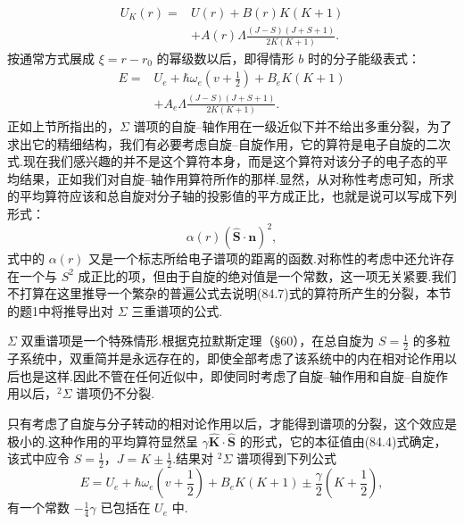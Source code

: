 \begin{equation}
\begin{aligned}
  U_K(r)={}&U(r)+B(r)K(K+1)\\
  &+A(r)\Lambda\frac{(J-S)(J+S+1)}{2K(K+1)}.
\end{aligned}
\end{equation}
按通常方式展成 $\xi=r-r_0$ 的幂级数以后，即得情形 $b$ 时的分子能级表式：
\begin{equation}
\begin{aligned}
  E={}&U_e+\hbar\omega_e\left(v+\frac{1}{2}\right)+B_eK(K+1)\\
  &+A_e\Lambda\frac{(J-S)(J+S+1)}{2K(K+1)}.
\end{aligned}
\end{equation}
正如上节所指出的，$\Sigma$ 谱项的自旋–轴作用在一级近似下并不给出多重分裂，为了求出它的精细结构，我们有必要考虑自旋–自旋作用，它的算符是电子自旋的二次式.现在我们感兴趣的并不是这个算符本身，而是这个算符对该分子的电子态的平均结果，正如我们对自旋–轴作用算符所作的那样.显然，从对称性考虑可知，所求的平均算符应该和总自旋对分子轴的投影值的平方成正比，也就是说可以写成下列形式：
\begin{equation}
  \alpha(r)(\hat{\boldsymbol{S}}\cdot\boldsymbol{n})^2,
\end{equation}
式中的 $\alpha(r)$ 又是一个标志所给电子谱项的距离的函数.对称性的考虑中还允许存在一个与 $S^2$ 成正比的项，但由于自旋的绝对值是一个常数，这一项无关紧要.我们不打算在这里推导一个繁杂的普遍公式去说明(84.7)式的算符所产生的分裂，本节的题1中将推导出对 $\Sigma$ 三重谱项的公式.

$\Sigma$ 双重谱项是一个特殊情形.根据克拉默斯定理（§60），在总自旋为 $S=\frac{1}{2}$ 的多粒子系统中，双重简并是永远存在的，即使全部考虑了该系统中的内在相对论作用以后也是这样.因此不管在任何近似中，即使同时考虑了自旋–轴作用和自旋–自旋作用以后，$^2\Sigma$ 谱项仍不分裂.

只有考虑了自旋与分子转动的相对论作用以后，才能得到谱项的分裂，这个效应是极小的.这种作用的平均算符显然呈 $\gamma\hat{\boldsymbol{K}}\cdot\hat{\boldsymbol{S}}$ 的形式，它的本征值由(84.4)式确定，该式中应令 $S=\frac{1}{2}$，$J=K\pm\frac{1}{2}$.结果对 $^2\Sigma$ 谱项得到下列公式
\begin{equation}
  E=U_e+\hbar\omega_e\left(v+\frac{1}{2}\right)+B_eK(K+1)
  \pm\frac{\gamma}{2}\left(K+\frac{1}{2}\right),
\end{equation}
有一个常数 $-\frac{1}{4}\gamma$ 已包括在 $U_e$ 中.

